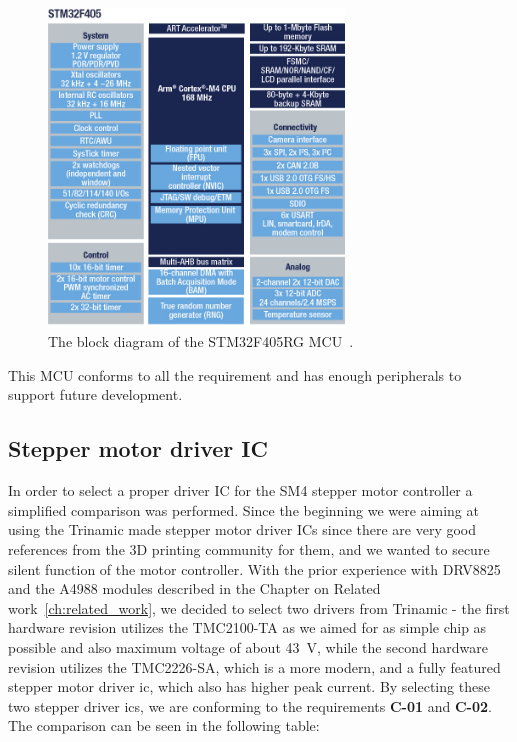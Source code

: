 \begin{figure}[H]
    \centering
    \includegraphics[width=0.7\textwidth]{obrazky/stm32f405_block_diagram}
    \caption{The block diagram of the STM32F405RG MCU~\cite{stmicro_enbd_stm32f405_1mbjpg_nodate}.}
    \label{fig:stm32f405_block_diagram}
\end{figure}

This MCU conforms to all the requirement and has enough peripherals to support future development.

\subsection{Stepper motor driver IC}
\label{subsec:stepper_ic}
In order to select a proper driver IC for the SM4 stepper motor controller a simplified comparison was performed.
Since the beginning we were aiming at using the Trinamic made stepper motor driver ICs since there are very good references from the 3D printing community\cite{prusa_original_2017,prusa_original_2019,3daddict_stepper_2020} for them, and we wanted to secure silent function of the motor controller.
With the prior experience with DRV8825 and the A4988 modules described in the Chapter on Related work~\ref{ch:related_work}, we decided to select two drivers from Trinamic - the first hardware revision utilizes the TMC2100-TA as we aimed for as simple chip as possible and also maximum voltage of about 43~V, while the second hardware revision utilizes the TMC2226-SA, which is a more modern, and a fully featured stepper motor driver \acs{ic}, which also has higher peak current.
By selecting these two stepper driver \acs{ic}s, we are conforming to the requirements \textbf{C-01} and \textbf{C-02}.
The comparison can be seen in the following table:

